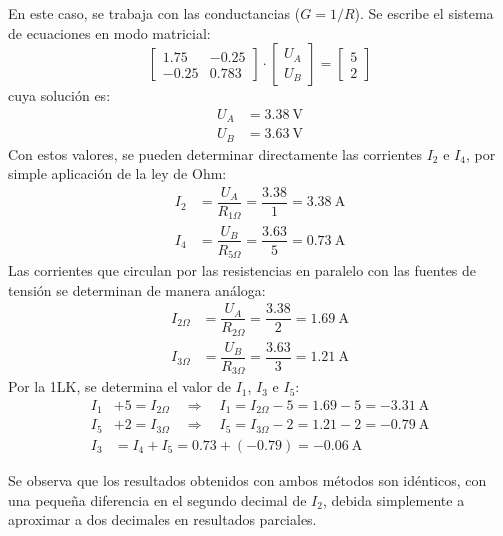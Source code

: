 En este caso, se trabaja con las conductancias ($G=1/R$). Se
escribe el sistema de ecuaciones en modo matricial:
\begin{equation*}
  \begin{bmatrix}
    1.75 & - 0.25\\
    -0.25 & 0.783
  \end{bmatrix} \cdot%
  \begin{bmatrix}
    U_A\\
    U_B
  \end{bmatrix} = %
  \begin{bmatrix}
    5\\
    2
  \end{bmatrix}
\end{equation*}
cuya solución es:
\begin{align*}
  U_A&=\qty{3.38}{\volt}\\
  U_B&=\qty{3.63}{\volt}
\end{align*}
Con estos valores, se pueden determinar directamente las corrientes
$I_2$ e $I_4$, por simple aplicación de la ley de Ohm:
\begin{align*}
  I_2&=\dfrac{U_A}{R_{1\Omega}}=\dfrac{3.38}{1}=\qty{3.38}{\ampere}\\
  I_4&=\dfrac{U_B}{R_{5\Omega}}=\dfrac{3.63}{5}=\qty{0.73}{\ampere}
\end{align*}
Las corrientes que circulan por las resistencias en paralelo con las
fuentes de tensión se determinan de manera análoga:
\begin{align*}
  I_{2\Omega}&=\dfrac{U_A}{R_{2\Omega}}=\dfrac{3.38}{2}=\qty{1.69}{\ampere}\\
  I_{3\Omega}&=\dfrac{U_B}{R_{3\Omega}}=\dfrac{3.63}{3}=\qty{1.21}{\ampere}
\end{align*}
Por la 1LK, se determina el valor de $I_1$, $I_3$ e $I_5$:
\begin{align*}
  I_1&+5=I_{2\Omega} \quad \Rightarrow \quad I_1=I_{2\Omega}-5=1.69-5=\qty{-3.31}{\ampere}\\
  I_5&+2=I_{3\Omega} \quad \Rightarrow \quad I_5=I_{3\Omega}-2=1.21-2=\qty{-0.79}{\ampere}\\
  I_3&=I_4+I_5=0.73+(-0.79)=\qty{-0.06}{\ampere}
\end{align*}

Se observa que los resultados obtenidos con ambos métodos son
idénticos, con una pequeña diferencia en el segundo decimal de $I_2$, debida simplemente a aproximar a dos decimales en resultados parciales.

